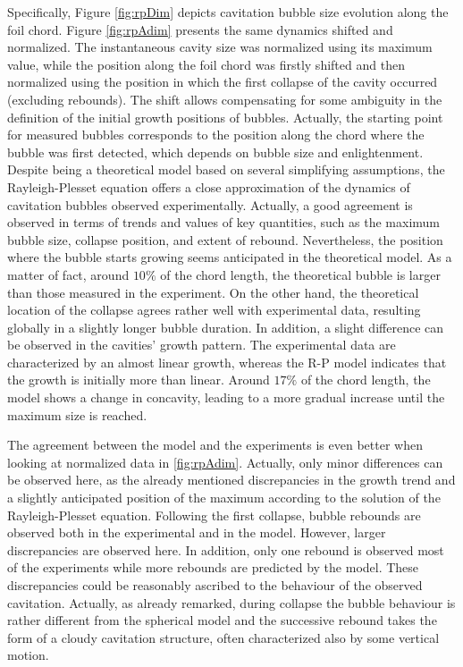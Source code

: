 Specifically, Figure \ref{fig:rpDim} depicts cavitation bubble size evolution along the foil chord. 
Figure \ref{fig:rpAdim} presents the same dynamics shifted and normalized. The instantaneous cavity size was normalized using its maximum value, while the position along the foil chord was firstly shifted and then normalized using the position in which the first collapse of the cavity occurred (excluding rebounds). The shift allows compensating for some ambiguity in the definition of the initial growth positions of bubbles. Actually, the starting point for measured bubbles corresponds to the position along the chord where the bubble was first detected, which depends on bubble size and enlightenment.
Despite being a theoretical model based on several simplifying assumptions, the Rayleigh-Plesset equation offers a close approximation of the dynamics of cavitation bubbles observed experimentally. 
Actually, a good agreement is observed in terms of trends and values of key quantities, such as the maximum bubble size, collapse position, and extent of rebound. 
Nevertheless, the position where the bubble starts growing seems anticipated in the theoretical model. As a matter of fact, around $10\%$ of the chord length, the theoretical bubble is larger than those measured in the experiment. On the other hand, the theoretical location of the collapse agrees rather well with experimental data, resulting globally in a slightly longer bubble duration.
In addition, a slight difference can be observed in the cavities' growth pattern. The experimental data are characterized by an almost linear growth, whereas the R-P model indicates that the growth is initially more than linear. Around $17\%$ of the chord length, the model shows a change in concavity, leading to a more gradual increase until the maximum size is reached.

The agreement between the model and the experiments is even better when looking at normalized data in \ref{fig:rpAdim}. Actually, only minor differences can be observed here, as the already mentioned discrepancies in the growth trend and a slightly anticipated position of the maximum according to the solution of the Rayleigh-Plesset equation.
Following the first collapse, bubble rebounds are observed both in the experimental and in the model. However, larger discrepancies are observed here. In addition, only one rebound is observed most of the experiments while more rebounds are predicted by the model. These discrepancies could be reasonably ascribed to the behaviour of the observed cavitation. 
Actually, as already remarked, during collapse the bubble behaviour is rather different from the spherical model and the successive rebound takes the form of a cloudy cavitation structure, often characterized also by some vertical motion.

